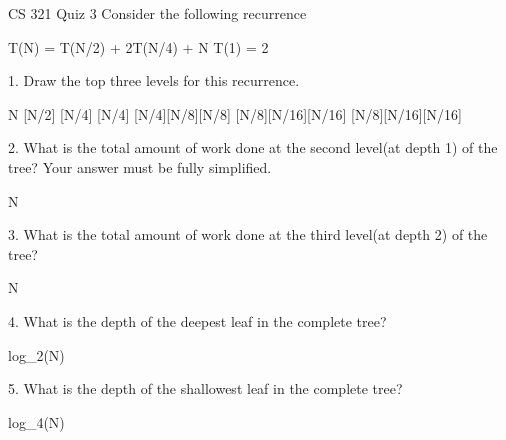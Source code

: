 CS 321
Quiz 3
Consider the following recurrence

T(N) = T(N/2) + 2T(N/4) + N
T(1) = 2

  1. Draw the top three levels for this recurrence.
  
                        N
     [N/2]             [N/4]             [N/4]
[N/4][N/8][N/8]   [N/8][N/16][N/16]   [N/8][N/16][N/16]

  2. What is the total amount of work done at the second level(at depth 1) of the tree? Your answer must be fully simplified.
    
    N
    
  3. What is the total amount of work done at the third level(at depth 2) of the tree?
  
    N
  
  4. What is the depth of the deepest leaf in the complete tree?
  
    log_2(N)
  
  5. What is the depth of the shallowest leaf in the complete tree?
  
    log_4(N)
